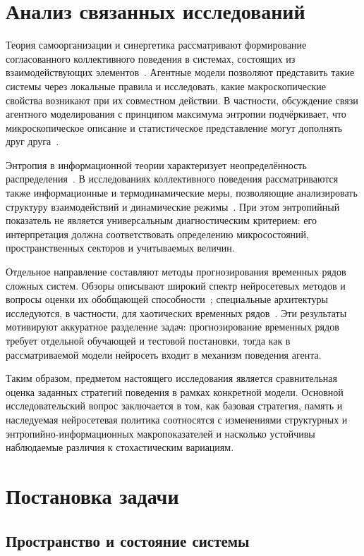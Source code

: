 \documentclass{misisarticle}
\begin{document}
\section{Анализ связанных исследований}

Теория самоорганизации и синергетика рассматривают формирование согласованного коллективного поведения в системах, состоящих из взаимодействующих элементов~\cite{haken,nicolis}. Агентные модели позволяют представить такие системы через локальные правила и исследовать, какие макроскопические свойства возникают при их совместном действии. В частности, обсуждение связи агентного моделирования с принципом максимума энтропии подчёркивает, что микроскопическое описание и статистическое представление могут дополнять друг друга~\cite{yangcarro}.

Энтропия в информационной теории характеризует неопределённость распределения~\cite{shannon}. В исследованиях коллективного поведения рассматриваются также информационные и термодинамические меры, позволяющие анализировать структуру взаимодействий и динамические режимы~\cite{chen}. При этом энтропийный показатель не является универсальным диагностическим критерием: его интерпретация должна соответствовать определению микросостояний, пространственных секторов и учитываемых величин.

Отдельное направление составляют методы прогнозирования временных рядов сложных систем. Обзоры описывают широкий спектр нейросетевых методов и вопросы оценки их обобщающей способности~\cite{lim,torres}; специальные архитектуры исследуются, в частности, для хаотических временных рядов~\cite{meng}. Эти результаты мотивируют аккуратное разделение задач: прогнозирование временных рядов требует отдельной обучающей и тестовой постановки, тогда как в рассматриваемой модели нейросеть входит в механизм поведения агента.

Таким образом, предметом настоящего исследования является сравнительная оценка заданных стратегий поведения в рамках конкретной модели. Основной исследовательский вопрос заключается в том, как базовая стратегия, память и наследуемая нейросетевая политика соотносятся с изменениями структурных и энтропийно-информационных макропоказателей и насколько устойчивы наблюдаемые различия к стохастическим вариациям.

\section{Постановка задачи}

\subsection{Пространство и состояние системы}
\end{document}
